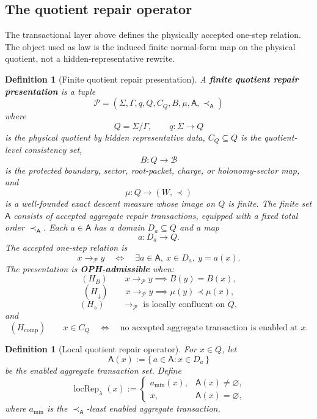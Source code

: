 \documentclass[11pt]{article}
\newtheorem{definition}[theorem]{Definition}
\theoremstyle{remark}
\theoremstyle{plain}
\begin{document}
\subsection{The quotient repair operator}

The transactional layer above defines the physically accepted one-step relation.  The object used
as law is the induced finite normal-form map on the physical quotient, not a hidden-representative
rewrite.

\begin{definition}[Finite quotient repair presentation]\label{def:finite-quotient-repair-presentation}
A \textbf{finite quotient repair presentation} is a tuple
\[
\mathcal P=(\Sigma,\Gamma,q,Q,C_Q,B,\mu,\mathsf A,\prec_{\mathsf A})
\]
where
\[
Q=\Sigma/\Gamma,\qquad q:\Sigma\to Q
\]
is the physical quotient by hidden representative data, \(C_Q\subseteq Q\) is the
quotient-level consistency set,
\[
B:Q\to\mathcal B
\]
is the protected boundary, sector, root-packet, charge, or holonomy-sector map, and
\[
\mu:Q\to(W,\prec)
\]
is a well-founded exact descent measure whose image on \(Q\) is finite.  The finite set
\(\mathsf A\) consists of accepted aggregate repair transactions, equipped with a fixed total
order \(\prec_{\mathsf A}\).  Each \(a\in\mathsf A\) has a domain \(D_a\subseteq Q\) and a map
\[
a:D_a\to Q.
\]
The accepted one-step relation is
\[
x\to_{\mathcal P} y
\quad\Longleftrightarrow\quad
\exists a\in\mathsf A,\ x\in D_a,\ y=a(x).
\]
The presentation is \textbf{OPH-admissible} when:
\[
(H_B)\qquad x\to_{\mathcal P}y\implies B(y)=B(x),
\]
\[
(H_\downarrow)\qquad x\to_{\mathcal P}y\implies \mu(y)\prec\mu(x),
\]
\[
(H_\diamond)\qquad \to_{\mathcal P}\text{ is locally confluent on }Q,
\]
and
\[
(H_{\mathrm{comp}})\qquad
x\in C_Q
\quad\Longleftrightarrow\quad
\text{no accepted aggregate transaction is enabled at }x.
\]
\end{definition}

\begin{definition}[Local quotient repair operator]\label{def:local-quotient-repair-operator}
For \(x\in Q\), let
\[
\mathsf A(x):=\{\,a\in\mathsf A:x\in D_a\,\}
\]
be the enabled aggregate transaction set.  Define
\[
\operatorname{locRep}_\lambda(x):=
\begin{cases}
a_{\min}(x),& \mathsf A(x)\ne\varnothing,\\
x,& \mathsf A(x)=\varnothing,
\end{cases}
\]
where \(a_{\min}\) is the \(\prec_{\mathsf A}\)-least enabled aggregate transaction.
\end{definition}
\end{document}
